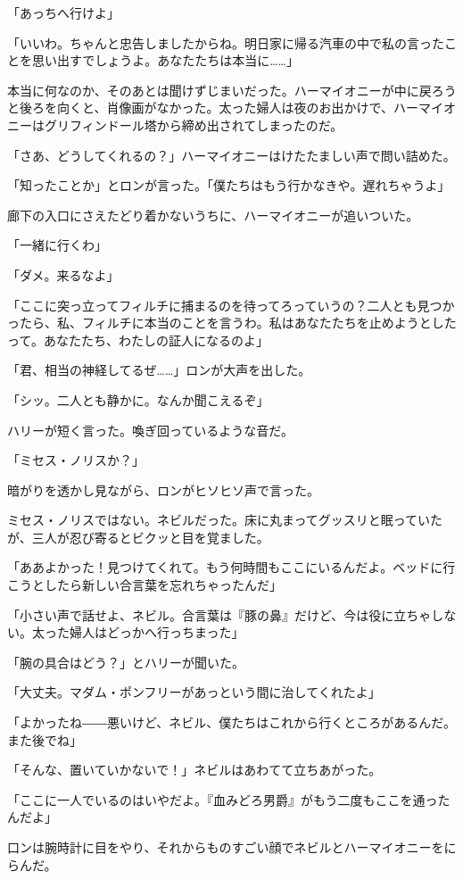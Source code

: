 \documentclass[10pt,a4paper]{article}
\begin{document}
\begin{CJK}{UTF8}{min}
「あっちへ行けよ」

「いいわ。ちゃんと忠告しましたからね。明日家に帰る汽車の中で私の言ったことを思い出すでしょうよ。あなたたちは本当に……」

本当に何なのか、そのあとは聞けずじまいだった。ハーマイオニーが中に戻ろうと後ろを向くと、肖像画がなかった。太った婦人は夜のお出かけで、ハーマイオニーはグリフィンドール塔から締め出されてしまったのだ。

「さあ、どうしてくれるの？」ハーマイオニーはけたたましい声で問い詰めた。

「知ったことか」とロンが言った。「僕たちはもう行かなきや。遅れちゃうよ」

廊下の入口にさえたどり着かないうちに、ハーマイオニーが追いついた。

「一緒に行くわ」

「ダメ。来るなよ」

「ここに突っ立ってフィルチに捕まるのを待ってろっていうの？二人とも見つかったら、私、フィルチに本当のことを言うわ。私はあなたたちを止めようとしたって。あなたたち、わたしの証人になるのよ」

「君、相当の神経してるぜ……」ロンが大声を出した。

「シッ。二人とも静かに。なんか聞こえるぞ」

ハリーが短く言った。喚ぎ回っているような音だ。

「ミセス・ノリスか？」

暗がりを透かし見ながら、ロンがヒソヒソ声で言った。

ミセス・ノリスではない。ネビルだった。床に丸まってグッスリと眠っていたが、三人が忍び寄るとビクッと目を覚ました。

「ああよかった！見つけてくれて。もう何時間もここにいるんだよ。ベッドに行こうとしたら新しい合言葉を忘れちゃったんだ」

「小さい声で話せよ、ネビル。合言葉は『豚の鼻』だけど、今は役に立ちゃしない。太った婦人はどっかへ行っちまった」

「腕の具合はどう？」とハリーが聞いた。

「大丈夫。マダム・ポンフリーがあっという間に治してくれたよ」

「よかったね――悪いけど、ネビル、僕たちはこれから行くところがあるんだ。また後でね」

「そんな、置いていかないで！」ネビルはあわてて立ちあがった。

「ここに一人でいるのはいやだよ。『血みどろ男爵』がもう二度もここを通ったんだよ」

口ンは腕時計に目をやり、それからものすごい顔でネビルとハーマイオニーをにらんだ。


\end{CJK}
\end{document}
